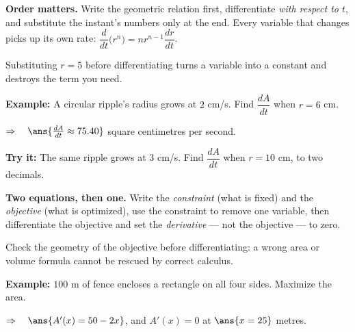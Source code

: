\documentclass[12pt]{article}
\begin{document}


\begin{formulabox}
\textbf{Order matters.} Write the geometric relation first, differentiate
\emph{with respect to $t$}, and substitute the instant's numbers only at the
end. Every variable that changes picks up its own rate:
$\dfrac{d}{dt}\big(r^n\big) = nr^{n-1}\dfrac{dr}{dt}$.\par
Substituting $r = 5$ before differentiating turns a variable into a constant
and destroys the term you need.
\end{formulabox}

\begin{examplebox}
\textbf{Example:} \quad A circular ripple's radius grows at $2$ cm/s. Find
$\dfrac{dA}{dt}$ when $r = 6$ cm.

$\Rightarrow\quad \ans{\frac{dA}{dt} \approx 75.40}$ square centimetres per second.
\end{examplebox}

\begin{tryitbox}
\textbf{Try it:} \quad The same ripple grows at $3$ cm/s. Find $\dfrac{dA}{dt}$
when $r = 10$ cm, to two decimals.\\[2pt]
\end{tryitbox}


\begin{formulabox}
\textbf{Two equations, then one.} Write the \emph{constraint} (what is fixed)
and the \emph{objective} (what is optimized), use the constraint to remove one
variable, then differentiate the objective and set the \emph{derivative} --- not
the objective --- to zero.\par
Check the geometry of the objective before differentiating: a wrong area or
volume formula cannot be rescued by correct calculus.
\end{formulabox}

\begin{examplebox}
\textbf{Example:} \quad $100$ m of fence encloses a rectangle on all four sides.
Maximize the area.

$\Rightarrow\quad \ans{A'(x) = 50 - 2x}$, \quad and $A'(x) = 0$ at $\ans{x = 25}$ metres.
\end{examplebox}
\end{document}
